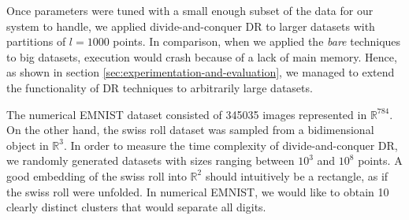 Once parameters were tuned with a small enough subset of the data for our system to handle, we applied divide-and-conquer DR to larger datasets with partitions of $l=1000$ points. In comparison, when we applied the \textit{bare} techniques to big datasets, execution would crash because of a lack of main memory. Hence, as shown in section \ref{sec:experimentation-and-evaluation}, we managed to extend the functionality of DR techniques to arbitrarily large datasets.

The numerical EMNIST dataset consisted of 345035 images represented in $\mathbb{R}^{784}$. On the other hand, the swiss roll dataset was sampled from a bidimensional object in $\mathbb{R}^3$. In order to measure the time complexity of divide-and-conquer DR, we randomly generated datasets with sizes ranging between $10^3$ and $10^8$ points. A good embedding of the swiss roll into $\mathbb{R}^2$ should intuitively be a rectangle, as if the swiss roll were unfolded. In numerical EMNIST, we would like to obtain 10 clearly distinct clusters that would separate all digits. 